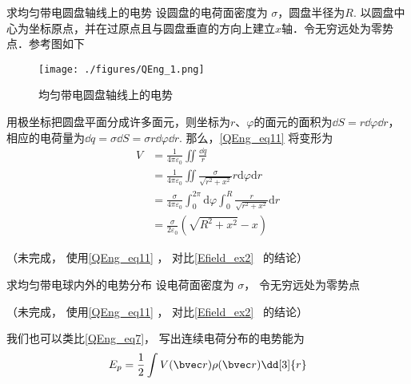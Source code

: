 \begin{example}{求均匀带电圆盘轴线上的电势}
设圆盘的电荷面密度为 $\sigma$，圆盘半径为$R$. 以圆盘中心为坐标原点，并在过原点且与圆盘垂直的方向上建立$x$轴．令无穷远处为零势点．参考图如下
\begin{figure}[ht]
\centering
\texttt{[image: ./figures/QEng\_1.png]}
\caption{均匀带电圆盘轴线上的电势} \label{QEng_fig1}
\end{figure}

用极坐标把圆盘平面分成许多面元，则坐标为$r$、$\varphi$的面元的面积为$\dd S=r\dd \varphi \dd r$，相应的电荷量为$\dd q=\sigma\dd S=\sigma r\dd \varphi \dd r$. 那么，\autoref{QEng_eq11} 将变形为
\begin{equation}
\begin{aligned}
V & =\frac{1}{4 \pi \varepsilon_{0}}\iint \frac{\dd q }{r}\\
& =\frac{1}{4 \pi \varepsilon_{0}}\iint \frac{\sigma }{ \sqrt{r^{2}+x^{2}}}r \mathrm{d} \varphi \mathrm{d} r\\
& = \frac{\sigma}{4 \pi \varepsilon_{0}} \int_{0}^{2 \pi} \mathrm{d} \varphi \int_{0}^{R} \frac{r}{\sqrt{r^{2}+x^{2}}}\mathrm{d} r\\ 
& = \frac{\sigma}{2 \varepsilon_{0}}\left(\sqrt{R^{2}+x^{2}}-x\right)
\end{aligned}
\end{equation}


（未完成， 使用\autoref{QEng_eq11} ， 对比\autoref{Efield_ex2}~ 的结论）
\end{example}

\begin{example}{求均匀带电球内外的电势分布}
设电荷面密度为 $\sigma$， 令无穷远处为零势点

（未完成， 使用\autoref{QEng_eq11} ， 对比\autoref{Efield_ex2}~ 的结论）
\end{example}

我们也可以类比\autoref{QEng_eq7}， 写出连续电荷分布的电势能为
\begin{equation}\label{QEng_eq8}
E_p = \frac 12 \int V(\bvec r) \rho(\bvec r) \dd[3]{r}
\end{equation}

